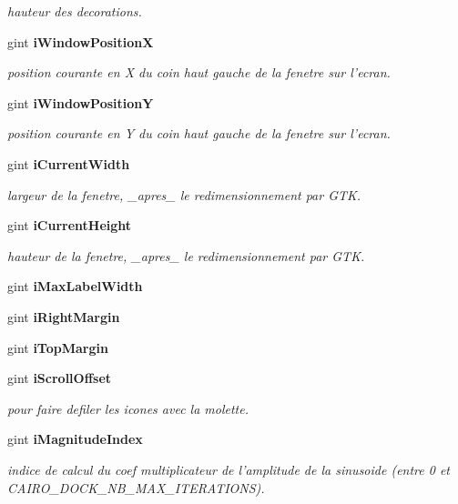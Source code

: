 \begin{CompactItemize}
\begin{CompactList}\small\item\em hauteur des decorations. \item\end{CompactList}\item 
gint {\bf iWindowPositionX}
\begin{CompactList}\small\item\em position courante en X du coin haut gauche de la fenetre sur l'ecran. \item\end{CompactList}\item 
gint {\bf iWindowPositionY}
\begin{CompactList}\small\item\em position courante en Y du coin haut gauche de la fenetre sur l'ecran. \item\end{CompactList}\item 
gint {\bf iCurrentWidth}
\begin{CompactList}\small\item\em largeur de la fenetre, \_\-apres\_\- le redimensionnement par GTK. \item\end{CompactList}\item 
gint {\bf iCurrentHeight}
\begin{CompactList}\small\item\em hauteur de la fenetre, \_\-apres\_\- le redimensionnement par GTK. \item\end{CompactList}\item 
gint {\bf iMaxLabelWidth}
\item 
gint {\bf iRightMargin}
\item 
gint {\bf iTopMargin}
\item 
gint {\bf iScrollOffset}
\begin{CompactList}\small\item\em pour faire defiler les icones avec la molette. \item\end{CompactList}\item 
gint {\bf iMagnitudeIndex}
\begin{CompactList}\small\item\em indice de calcul du coef multiplicateur de l'amplitude de la sinusoide (entre 0 et CAIRO\_\-DOCK\_\-NB\_\-MAX\_\-ITERATIONS). \item\end{CompactList}\item 

\end{CompactItemize}
